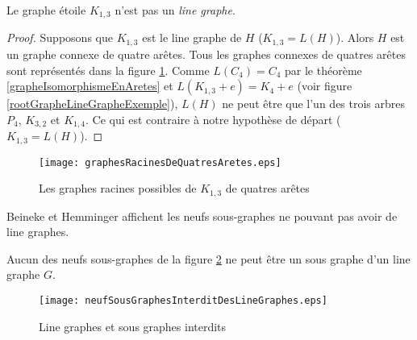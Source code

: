\begin{proposition}
Le graphe \'etoile $K_{1,3}$ n'est pas un {\em line graphe}.
\end{proposition}
\begin{proof}
Supposons que $K_{1,3}$ est le line graphe de $H$ ($K_{1,3} = L(H)$). 
Alors $H$ est un graphe connexe de quatre ar\^etes.
Tous les graphes connexes de quatres ar\^etes sont repr\'esent\'es dans la figure  \ref{graphesRacinesDeQuatresAretes}. 
Comme $L(C_4) = C_4$ par le th\'eor\`eme \ref{grapheIsomorphismeEnAretes} et $L(K_{1,3} + e) = K_4 + e$ (voir figure \ref{rootGrapheLineGrapheExemple}), $L(H)$ ne peut \^etre que l'un des trois arbres $P_4$, $K_{3,2}$ et $K_{1,4}$.
Ce qui est contraire \`a notre hypoth\`ese de d\'epart ($K_{1,3} = L(H)$).
\end{proof}
\begin{centering}\vspace{-0.5em}
	\begin{figure}[htb!]\vspace{-0.5em}
	\texttt{[image: graphesRacinesDeQuatresAretes.eps]}\vspace{-0.5em}
	\caption{ Les graphes racines possibles de $K_{1,3}$ de quatres ar\^etes   }\vspace{-0.5em}
	\label{graphesRacinesDeQuatresAretes}
	\end{figure}
\end{centering}

Beineke et Hemminger \cite{neufLineGrapheInterdit}  affichent les neufs sous-graphes ne pouvant pas avoir de line graphes.
\begin{theorem}
Aucun des neufs sous-graphes de la figure \ref{neufSousGraphesInterditDesLineGraphes} ne peut \^etre un sous graphe d'un line graphe $G$.
\end{theorem}
\begin{centering}\vspace{-0.5em}
	\begin{figure}[htb!]\vspace{-0.5em}
	\texttt{[image: neufSousGraphesInterditDesLineGraphes.eps]}\vspace{-0.5em}
	\caption{ Line graphes et sous graphes interdits }\vspace{-0.5em}
	\label{neufSousGraphesInterditDesLineGraphes}
	\end{figure}
\end{centering}

